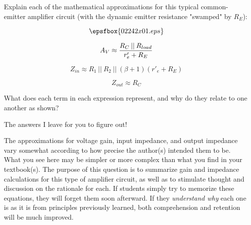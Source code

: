 

Explain each of the mathematical approximations for this typical common-emitter amplifier circuit (with the dynamic emitter resistance "swamped" by $R_E$):

$$\epsfbox{02242x01.eps}$$

$$A_V \approx {R_C \> || \> R_{load} \over r'_e + R_E}$$

$$Z_{in} \approx R_1 \> || \> R_2 \> || \> (\beta + 1)(r'_e + R_E)$$

$$Z_{out} \approx R_C$$

What does each term in each expression represent, and why do they relate to one another as shown?







The answers I leave for you to figure out!







The approximations for voltage gain, input impedance, and output impedance vary somewhat according to how precise the author(s) intended them to be.  What you see here may be simpler or more complex than what you find in your textbook(s).  The purpose of this question is to summarize gain and impedance calculations for this type of amplifier circuit, as well as to stimulate thought and discussion on the rationale for each.  If students simply try to memorize these equations, they will forget them soon afterward.  If they {\it understand why} each one is as it is from principles previously learned, both comprehension and retention will be much improved.




